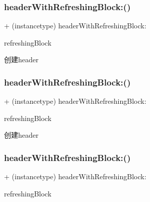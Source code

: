 \subsubsection{\texorpdfstring{header\+With\+Refreshing\+Block\+:()}{headerWithRefreshingBlock:()}\hspace{0.1cm}{\footnotesize\ttfamily [1/3]}}
{\footnotesize\ttfamily + (instancetype) header\+With\+Refreshing\+Block\+: \begin{DoxyParamCaption}\item[{(M\+J\+Refresh\+Component\+Refreshing\+Block)}]{refreshing\+Block }\end{DoxyParamCaption}}

创建header \mbox{\label{interface_m_j_refresh_header_a2ed5c544baf8b03be7e025dac197c868}} 
\subsubsection{\texorpdfstring{header\+With\+Refreshing\+Block\+:()}{headerWithRefreshingBlock:()}\hspace{0.1cm}{\footnotesize\ttfamily [2/3]}}
{\footnotesize\ttfamily + (instancetype) header\+With\+Refreshing\+Block\+: \begin{DoxyParamCaption}\item[{(M\+J\+Refresh\+Component\+Refreshing\+Block)}]{refreshing\+Block }\end{DoxyParamCaption}}

创建header \mbox{\label{interface_m_j_refresh_header_a2ed5c544baf8b03be7e025dac197c868}} 
\subsubsection{\texorpdfstring{header\+With\+Refreshing\+Block\+:()}{headerWithRefreshingBlock:()}\hspace{0.1cm}{\footnotesize\ttfamily [3/3]}}
{\footnotesize\ttfamily + (instancetype) header\+With\+Refreshing\+Block\+: \begin{DoxyParamCaption}\item[{(M\+J\+Refresh\+Component\+Refreshing\+Block)}]{refreshing\+Block }\end{DoxyParamCaption}}

